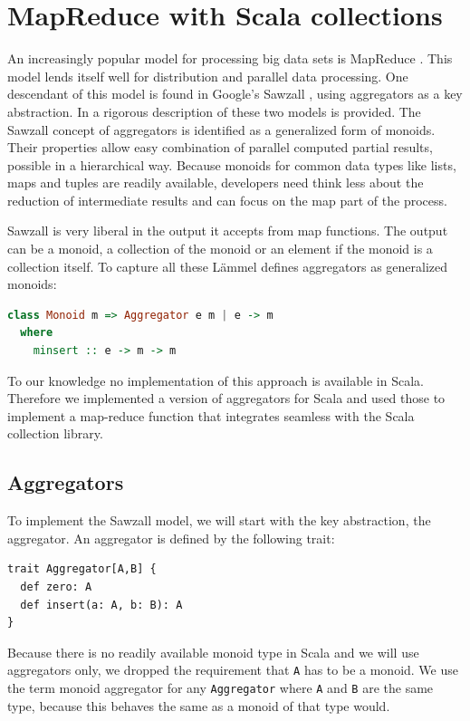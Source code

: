 \documentclass[10pt,a4paper]{article}
\begin{document}
\section{MapReduce with Scala collections}\label{sec:mapreduce}

An increasingly popular model for processing big data sets is MapReduce \citep{dean2008mapreduce}. This model lends itself well for distribution and parallel data processing. One descendant of this model is found in Google's Sawzall \citep{pike2005interpreting}, using aggregators as a key abstraction. In \cite{lammel2008google} a rigorous description of these two models is provided. The Sawzall concept of aggregators is identified as a generalized form of monoids. Their properties allow easy combination of parallel computed partial results, possible in a hierarchical way. Because monoids for common data types like lists, maps and tuples are readily available, developers need think less about the reduction of intermediate results and can focus on the map part of the process.

Sawzall is very liberal in the output it accepts from map functions. The output can be a monoid, a collection of the monoid or an element if the monoid is a collection itself. To capture all these L\"ammel defines aggregators as generalized monoids:
\begin{lstlisting}[language=haskell]
class Monoid m => Aggregator e m | e -> m
  where
    minsert :: e -> m -> m
\end{lstlisting}

To our knowledge no implementation of this approach is available in Scala. Therefore we implemented a version of aggregators for Scala and used those to implement a map-reduce function that integrates seamless with the Scala collection library.

\subsection{Aggregators}

To implement the Sawzall model, we will start with the key abstraction, the aggregator. An aggregator is defined by the following trait:
\begin{lstlisting}
trait Aggregator[A,B] {
  def zero: A
  def insert(a: A, b: B): A
}
\end{lstlisting}
Because there is no readily available monoid type in Scala and we will use aggregators only, we dropped the requirement that \lstinline|A| has to be a monoid. We use the term monoid aggregator for any \lstinline|Aggregator| where \lstinline|A| and \lstinline|B| are the same type, because this behaves the same as a monoid of that type would.
\end{document}
